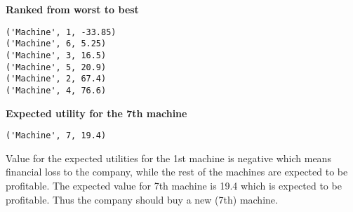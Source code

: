 \documentclass{article}
\begin{document}
\textbf{Ranked from worst to best}
\begin{verbatim}
('Machine', 1, -33.85)
('Machine', 6, 5.25)
('Machine', 3, 16.5)
('Machine', 5, 20.9)
('Machine', 2, 67.4)
('Machine', 4, 76.6)
\end{verbatim}
\textbf{Expected utility for the 7th machine}
\begin{verbatim}
('Machine', 7, 19.4)
\end{verbatim}

Value for the expected utilities for the 1st machine is negative which means financial loss to the company, while the rest of the machines are expected to be profitable. The expected value for 7th machine is 19.4 which is expected to be profitable.  Thus the company should buy a new (7th) machine.

\appendix
\end{document}
